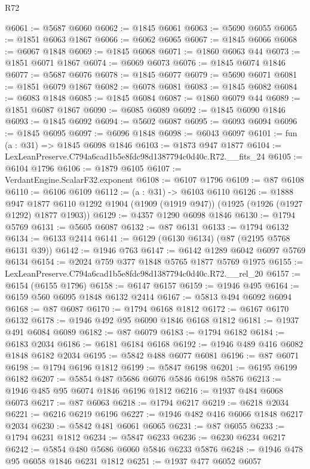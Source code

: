 \begin{lexlean}{R72}
\begin{coremodule}
@6061 := @5687 @6060
@6062 := @1845 @6061
@6063 := @5690 @6055
@6065 := @1851 @6063 @1867
@6066 := @6062 @6065
@6067 := @1845 @6066
@6068 := @6067 @1848
@6069 := @1845 @6068
@6071 := @1860 @6063 @44
@6073 := @1851 @6071 @1867
@6074 := @6069 @6073
@6076 := @1845 @6074 @1846
@6077 := @5687 @6076
@6078 := @1845 @6077
@6079 := @5690 @6071
@6081 := @1851 @6079 @1867
@6082 := @6078 @6081
@6083 := @1845 @6082
@6084 := @6083 @1848
@6085 := @1845 @6084
@6087 := @1860 @6079 @44
@6089 := @1851 @6087 @1867
@6090 := @6085 @6089
@6092 := @1845 @6090 @1846
@6093 := @1845 @6092
@6094 := @5602 @6087
@6095 := @6093 @6094
@6096 := @1845 @6095
@6097 := @6096 @1848
@6098 := @6043 @6097
@6101 := fun (a : @31) => @1845 @6098 @1846
@6103 := @1873 @947 @1877
@6104 := LexLeanPreserve.C794a6cad1b5e8fdc98d1387794c0d40c.R72.__fits_24
@6105 := @6104 @1796
@6106 := @1879 @6105
@6107 := VerdantEngine.ScalarF32.exponent
@6108 := @6107 @1796
@6109 := @87 @6108
@6110 := @6106 @6109
@6112 := (a : @31) -> @6103 @6110
@6126 := @1888
    @947
    @1877
    @6110
    @1292
    @1904
    (@1909 (@1919 @947))
    (@1925 (@1926 (@1927 @1292) @1877 @1903))
@6129 := @4357 @1290 @6098 @1846
@6130 := @1794 @5769
@6131 := @5605 @6087
@6132 := @87 @6131
@6133 := @1794 @6132
@6134 := @6133 @2414
@6141 := @6129 (@6130 @6134) (@87 (@2195 @5768 @6131 @39))
@6142 := @1946 @763
@6147 := @6142 @1289 @6042 @6097 @5769 @6134
@6154 := @2024 @759 @377 @1848 @5765 @1877 @5769 @1975
@6155 := LexLeanPreserve.C794a6cad1b5e8fdc98d1387794c0d40c.R72.__rel_20
@6157 := @6154 (@6155 @1796)
@6158 := @6147 @6157
@6159 := @1946 @495
@6164 := @6159 @560 @6095 @1848 @6132 @2414
@6167 := @5813 @494 @6092 @6094
@6168 := @87 @6087
@6170 := @1794 @6168 @1812
@6172 := @6167 @6170 @6132
@6178 := @1946 @492 @95 @6090 @1846 @6168 @1812
@6181 := @1937 @491 @6084 @6089
@6182 := @87 @6079
@6183 := @1794 @6182
@6184 := @6183 @2034
@6186 := @6181 @6184 @6168
@6192 := @1946 @489 @416 @6082 @1848 @6182 @2034
@6195 := @5842 @488 @6077 @6081
@6196 := @87 @6071
@6198 := @1794 @6196 @1812
@6199 := @5847 @6198
@6201 := @6195 @6199 @6182
@6207 := @5854 @487 @5686 @6076 @5846 @6198 @5876
@6213 := @1946 @485 @95 @6074 @1846 @6196 @1812
@6216 := @1937 @484 @6068 @6073
@6217 := @87 @6063
@6218 := @1794 @6217
@6219 := @6218 @2034
@6221 := @6216 @6219 @6196
@6227 := @1946 @482 @416 @6066 @1848 @6217 @2034
@6230 := @5842 @481 @6061 @6065
@6231 := @87 @6055
@6233 := @1794 @6231 @1812
@6234 := @5847 @6233
@6236 := @6230 @6234 @6217
@6242 := @5854 @480 @5686 @6060 @5846 @6233 @5876
@6248 := @1946 @478 @95 @6058 @1846 @6231 @1812
@6251 := @1937 @477 @6052 @6057

\end{coremodule}
\end{lexlean}
